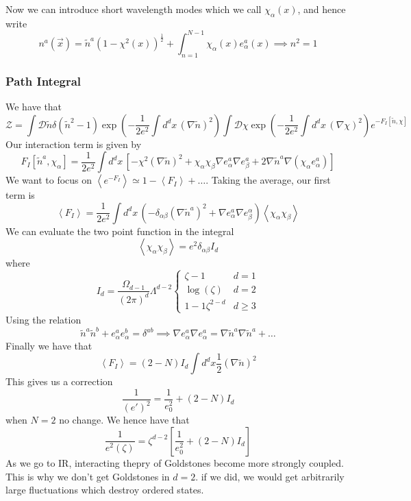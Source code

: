 Now we can introduce short wavelength modes 
which we call $ \chi_{ \alpha } ( x ) $, 
and hence write 
\[
n ^ a ( \vec{x} )  = \tilde{ n } ^ a ( 1 - \chi ^ 2( x )  )^{ \frac{1}{2 } }  + 
\int _{ n = 1 } ^{ N - 1 } \chi _{ \alpha } ( x) e ^ a _ \alpha ( x)  \implies n ^ 2 =1
\] 

\subsubsection{Path Integral} 
We have that 
\[
\mathcal{ Z } = \int \mathcal{ D } \tilde{ n } \delta ( \tilde{ n } ^ 2-  1 ) \exp 
\left(   - \frac{1}{2 e ^ 2 } \int d ^ d x \, ( \nabla \tilde{ n } ) ^ 2   \right) 
\int \mathcal{ D } \chi \exp \left(  -\frac{1}{ 2 e ^ 2 } \int d ^ d x \, ( \nabla \chi ) ^ 2  \right)  
e ^{  - F _ I [ \tilde{ n } , \chi ]  }
\] 
Our interaction term is given by 
\[
F _ I \left[  \tilde{ n } ^ a , \chi _{ \alpha }   \right]  
= \frac{1}{ 2 e  ^2 } \int d ^ d x \, \left[  
- \chi ^ 2 ( \nabla \tilde{ n } ) ^ 2 + \chi _ \alpha \chi _ \beta 
\nabla e ^ a _ \alpha \nabla e ^ a _ \beta + 2 \nabla \tilde{ n } ^ a \nabla ( \chi _ \alpha e ^ a _ \alpha )    \right]  
\]  We want to focus on $ \left< e ^{ - F _ I }  \right> \simeq 1 - \left< F _ I  \right> + \dots $. 
Taking the average, our first term is 
\[
\left< F _ I  \right>  = \frac{1}{2 e ^ 2 } \int d ^ d  x \, 
( - \delta _{ \alpha \beta } ( \nabla \tilde{ n } ^ a ) ^ 2 + \nabla e ^ a _ \alpha \nabla e ^ \alpha _ \beta ) \left< \chi _ \alpha
\chi _ \beta \right> 
\] We can evaluate the two point function in the integral 
\[
\left< \chi _ \alpha \chi _ \beta   \right>  = e^ 2 \delta _{ \alpha \beta } I _ d  
\] where 
\[
I _ d = \frac{ \Omega_{ d - 1} }{ ( 2 \pi ) ^ d } \Lambda ^{ d - 2 } \begin{cases}
	\zeta - 1  & d = 1 \\ \log ( \zeta ) & d =  2\\ 1 - 1\zeta ^{2 - d  } & d \geq  3
\end{cases} 
\] Using the relation 
\[
\tilde{ n } ^ a \tilde{ n } ^ b + e ^ a _ \alpha e ^ b _ \alpha  = \delta ^{ ab }    \implies 
\nabla e ^ a _ \alpha \nabla e ^ a _ \alpha = \nabla \tilde{ n } ^ a \nabla \tilde{ n } ^ a + \dots   
\] 
Finally we have that 
\[
\left< F _ I  \right>  =( 2 - N ) I _ d \int d ^ d x  \frac{1}{2 } ( \nabla \tilde{ n } ) ^ 2  
\] This gives us a correction 
\[
\frac{1}{( e ' ) ^ 2 } = \frac{1}{e _ 0 ^ 2 }+ ( 2 - N ) I _{ d }
\] when $ N = 2$ no change. 
We hence have that 
\[
\frac{1}{e ^ 2 ( \zeta ) } = \zeta ^{ d - 2} \left[  \frac{1}{e _ 0 ^ 2 } + ( 2- N ) I _ d  \right] 
\] As we go to IR, interacting thepry of Goldstones become more strongly coupled. 
This is why we don't get Goldstones in $ d = 2$. if we did, we would get
arbitrarily large fluctuations which destroy ordered states.

